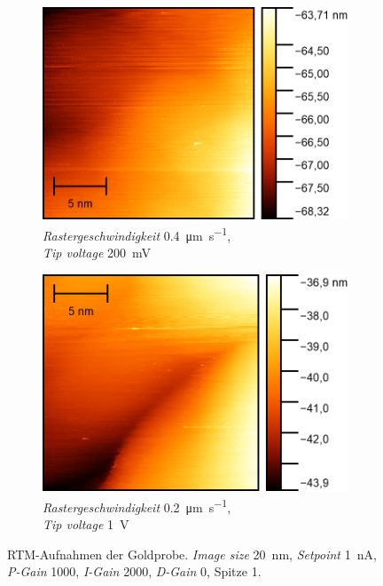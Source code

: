 \begin{figure}[H]
    \centering
    \begin{subfigure}{0.45\textwidth}
        \centering
        \includegraphics[width=\linewidth]{../figs/Gold10483}
        \caption{\textit{Rastergeschwindigkeit} \SI{0,4}{\micro\meter \per \second},\\ \textit{Tip voltage} \SI{200}{\milli \volt}}
    \end{subfigure}
    \begin{subfigure}{0.45\textwidth}
        \centering
        \includegraphics[width=\linewidth]{../figs/Gold10490}
        \caption{\textit{Rastergeschwindigkeit} \SI{0,2}{\micro\meter \per \second},\\ \textit{Tip voltage} \SI{1}{\volt}}
    \end{subfigure}
    \caption{RTM-Aufnahmen der Goldprobe. \textit{Image size} \SI{20}{\nano \meter}, \textit{Setpoint} \SI{1}{\nano \ampere},
    \textit{P-Gain} \num{1000}, \textit{I-Gain} \num{2000}, \textit{D-Gain} \num{0}, Spitze 1.}\label{fig:gold5}
\end{figure}

